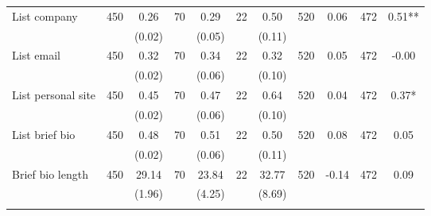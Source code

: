 \begin{tabular}{@{\extracolsep{5pt}}lcccccccccc}
List company   & 450    & 0.26    & 70    & 0.29    & 22    & 0.50    & 520    & 0.06    & 472    & 0.51**   \\
 &   & (0.02)  &   & (0.05)  &   & (0.11)  &   &  &   &  \\ [1ex]
List email   & 450    & 0.32    & 70    & 0.34    & 22    & 0.32    & 520    & 0.05    & 472    & -0.00   \\
 &   & (0.02)  &   & (0.06)  &   & (0.10)  &   &  &   &  \\ [1ex]
List personal site   & 450    & 0.45    & 70    & 0.47    & 22    & 0.64    & 520    & 0.04    & 472    & 0.37*   \\
 &   & (0.02)  &   & (0.06)  &   & (0.10)  &   &  &   &  \\ [1ex]
List brief bio   & 450    & 0.48    & 70    & 0.51    & 22    & 0.50    & 520    & 0.08    & 472    & 0.05   \\
 &   & (0.02)  &   & (0.06)  &   & (0.11)  &   &  &   &  \\ [1ex]
Brief bio length   & 450    & 29.14    & 70    & 23.84    & 22    & 32.77    & 520    & -0.14    & 472    & 0.09   \\
 &   & (1.96)  &   & (4.25)  &   & (8.69)  &   &  &   &  \\ [1ex]
\hline \hline \\[-1.8ex]

\end{tabular}
